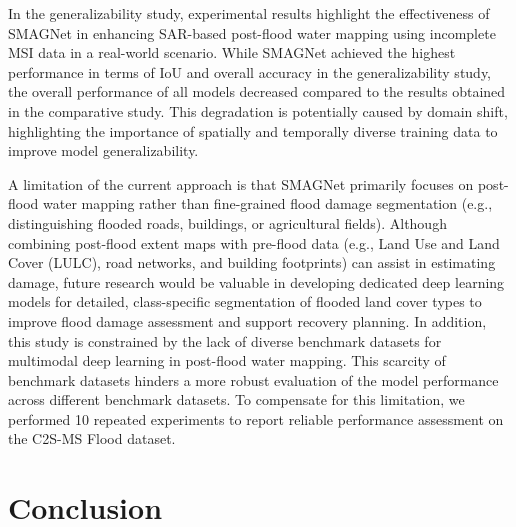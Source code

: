 \documentclass[preprint,12pt,authoryear]{elsarticle}
\begin{document}
In the generalizability study, experimental results highlight the effectiveness of SMAGNet in enhancing SAR-based post-flood water mapping using incomplete MSI data in a real-world scenario. While SMAGNet achieved the highest performance in terms of IoU and overall accuracy in the generalizability study, the overall performance of all models decreased compared to the results obtained in the comparative study. This degradation is potentially caused by domain shift, highlighting the importance of spatially and temporally diverse training data to improve model generalizability.

A limitation of the current approach is that SMAGNet primarily focuses on post-flood water mapping rather than fine-grained flood damage segmentation (e.g., distinguishing flooded roads, buildings, or agricultural fields). Although combining post-flood extent maps with pre-flood data (e.g., Land Use and Land Cover (LULC), road networks, and building footprints) can assist in estimating damage, future research would be valuable in developing dedicated deep learning models for detailed, class-specific segmentation of flooded land cover types to improve flood damage assessment and support recovery planning. In addition, this study is constrained by the lack of diverse benchmark datasets for multimodal deep learning in post-flood water mapping. This scarcity of benchmark datasets hinders a more robust evaluation of the model performance across different benchmark datasets. To compensate for this limitation, we performed 10 repeated experiments to report reliable performance assessment on the C2S-MS Flood dataset.

\section{Conclusion}
\label{Section7}
\end{document}
